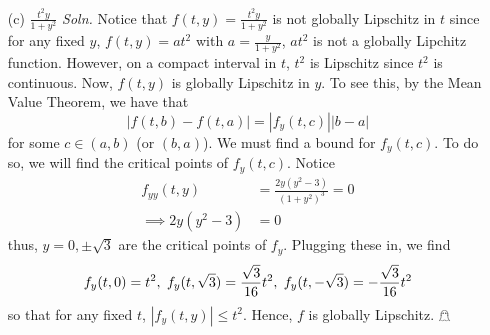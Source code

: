 \documentclass{article}
\begin{document}
\begin{itemize}
\begin{itemize}
        \item[(c)] $\frac{t^2y}{1 + y^2}$
        \newline\newline
        \textit{Soln.} Notice that $f(t,y) = \frac{t^2y}{1 + y^2}$ is not globally Lipschitz in $t$ since for any fixed $y$, $f(t,y) = at^2$ with $a = \frac{y}{1 + y^2}$, $at^2$ is not a globally Lipchitz function. However, on a compact interval in $t$, $t^2$ is Lipschitz since $t^2$ is continuous. Now, $f(t,y)$ is globally Lipschitz in $y$. To see this, by the Mean Value Theorem, we have that 
        \[|f(t,b) - f(t,a)| = |f_y(t,c)||b - a|\]
        for some $c \in (a,b)$ (or $(b,a)$). We must find a bound for $f_y(t,c)$. To do so, we will find the critical points of $f_y(t,c)$. Notice
        \begin{align*}
            f_{yy}(t,y) &= \frac{2y(y^2 - 3)}{(1 + y^2)^3} = 0\\
            \implies 2y(y^2 - 3) &= 0
        \end{align*}
        thus, $y = 0, \pm \sqrt{3}$ are the critical points of $f_y$. Plugging these in, we find
        \[f_y(t,0) = t^2, \hspace{0.3em} f_y(t,\sqrt{3}) = \frac{\sqrt{3}}{16}t^2, \hspace{0.3em} f_y(t,-\sqrt{3}) = -\frac{\sqrt{3}}{16}t^2\]
        so that for any fixed $t$, $|f_y(t,y)| \leq t^2$. Hence, $f$ is globally Lipschitz. \hfill $\mathghost$
    \end{itemize}
    


\end{itemize}
\end{document}
